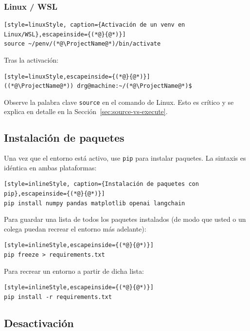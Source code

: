 \subsubsection{Linux / WSL}

\begin{lstlisting}[style=linuxStyle, caption={Activación de un venv en Linux/WSL},escapeinside={(*@}{@*)}]
source ~/penv/(*@\ProjectName@*)/bin/activate
\end{lstlisting}

Tras la activación:
\begin{lstlisting}[style=linuxStyle,escapeinside={(*@}{@*)}]
((*@\ProjectName@*)) drg@machine:~/(*@\ProjectName@*)$
\end{lstlisting}

\begin{warningbox}
Observe la palabra clave \texttt{source} en el comando de Linux. Esto es
crítico y se explica en detalle en la Sección~\ref{sec:source-vs-execute}.
\end{warningbox}

\subsection{Instalación de paquetes}

Una vez que el entorno está activo, use \texttt{pip} para instalar paquetes.
La sintaxis es idéntica en ambas plataformas:

\begin{lstlisting}[style=inlineStyle, caption={Instalación de paquetes con pip},escapeinside={(*@}{@*)}]
pip install numpy pandas matplotlib openai langchain
\end{lstlisting}

Para guardar una lista de todos los paquetes instalados (de modo que usted o
un colega puedan recrear el entorno más adelante):

\begin{lstlisting}[style=inlineStyle,escapeinside={(*@}{@*)}]
pip freeze > requirements.txt
\end{lstlisting}

Para recrear un entorno a partir de dicha lista:

\begin{lstlisting}[style=inlineStyle,escapeinside={(*@}{@*)}]
pip install -r requirements.txt
\end{lstlisting}

\subsection{Desactivación}

